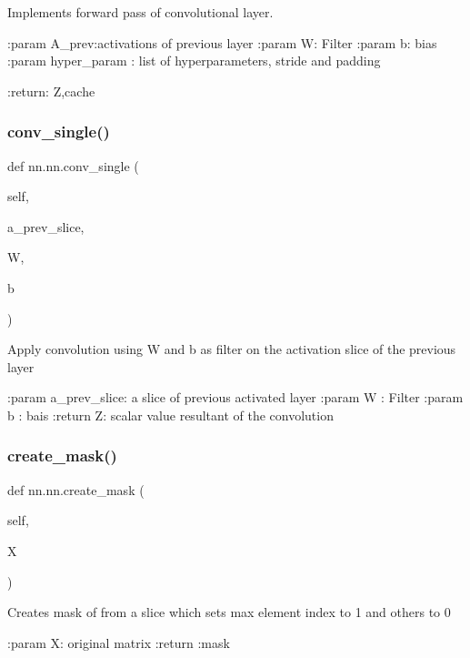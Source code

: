 \begin{DoxyVerb}Implements forward pass of convolutional layer.

:param A_prev:activations of previous layer
:param W: Filter
:param b: bias
:param hyper_param  : list of hyperparameters, stride and padding

:return: Z,cache
\end{DoxyVerb}
 \mbox{\label{classnn_1_1nn_a9d0fccfef95f2c245476afed656e80f6}} 
\subsubsection{\texorpdfstring{conv\+\_\+single()}{conv\_single()}}
{\footnotesize\ttfamily def nn.\+nn.\+conv\+\_\+single (\begin{DoxyParamCaption}\item[{}]{self,  }\item[{}]{a\+\_\+prev\+\_\+slice,  }\item[{}]{W,  }\item[{}]{b }\end{DoxyParamCaption})}

\begin{DoxyVerb}Apply convolution using W and b as filter on the activation slice of the previous layer

:param a_prev_slice: a slice of previous activated layer
:param W           : Filter
:param b           : bais
:return Z: scalar value resultant of the convolution
\end{DoxyVerb}
 \mbox{\label{classnn_1_1nn_aae4f8d920993bf5668b04f3525215c6f}} 
\subsubsection{\texorpdfstring{create\+\_\+mask()}{create\_mask()}}
{\footnotesize\ttfamily def nn.\+nn.\+create\+\_\+mask (\begin{DoxyParamCaption}\item[{}]{self,  }\item[{}]{X }\end{DoxyParamCaption})}

\begin{DoxyVerb}Creates mask of from a slice which sets max element index to 1 and others to 0

:param X: original matrix
:return :mask
\end{DoxyVerb}
 \mbox{\label{classnn_1_1nn_a822299322a0b513f8985e61096be45bc}} 
